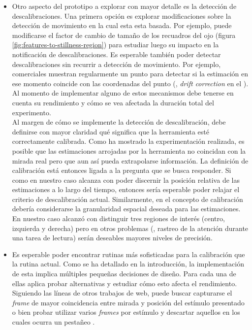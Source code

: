 \begin{itemize}
    \item
      Otro aspecto del prototipo a explorar con mayor detalle es la detección
      de descalibraciones.
      Una primera opción es explorar modificaciones sobre la detección de
      movimiento en la cual esta esta basada.
      Por ejemplo, puede modificarse el factor de cambio de tamaño de los
      recuadros del ojo (figura \ref{fig:features-to-stillness-region}) para
      estudiar luego su impacto en la notificación de descalibraciones.
      Es esperable también poder detectar descalibraciones sin recurrir a
      detección de movimiento.
      Por ejemplo, \eyetrackers comerciales muestran regularmente un punto para
      detectar si la estimación en ese momento coincide con las coordenadas del
      punto (\eg, \textit{drift correction} en el \eyetracker \eyelink).
      Al momento de implementar alguno de estos mecanismos debe tenerse en
      cuenta su rendimiento y cómo se vea afectada la duración total del
      experimento. \\
      Al margen de cómo se implemente la detección de descalibración, debe
      definirse con mayor claridad qué significa que la herramienta esté
      correctamente calibrada.
      Como ha mostrado la experimentación realizada, es posible que las
      estimaciones arrojadas por la herramienta no coincidan con la mirada real
      pero que aun así pueda extrapolarse información.
      La definición de calibración está entonces ligada a la pregunta que se
      busca responder.
      Si como en nuestro caso alcanza con poder discernir la posición relativa
      de las estimaciones a lo largo del tiempo, entonces sería esperable poder
      relajar el criterio de descalibración actual.
      Similarmente, en el concepto de calibración debería considerarse la
      granularidad espacial deseada para las estimaciones.
      En nuestro caso alcanzó con distinguir tres regiones de interés (centro,
      izquierda y derecha) pero en otros problemas (\eg, rastreo de la atención
      durante una tarea de lectura) serán deseables mayores niveles de
      precisión.
  
    \item
      Es esperable poder encontrar rutinas más sofisticadas para la calibración
      que la rutina actual.
      Como se ha detallado en la introducción, la implementación de esta
      implica múltiples pequeñas decisiones de diseño.
      Para cada una de ellas aplica probar alternativas y estudiar cómo esto
      afecta el rendimiento.
      Siguiendo las líneas de otros trabajos de \eyetracking web, puede buscar
      capturarse el \textit{frame} de mayor coincidencia entre mirada y
      posición del estímulo presentado \cite{huang_2016_pace} o bien probar
      utilizar varios \textit{frames} por estímulo y descartar aquellos en los
      cuales ocurra un pestañeo \cite{xu_2015_turker_gaze}. 
  

\end{itemize}
